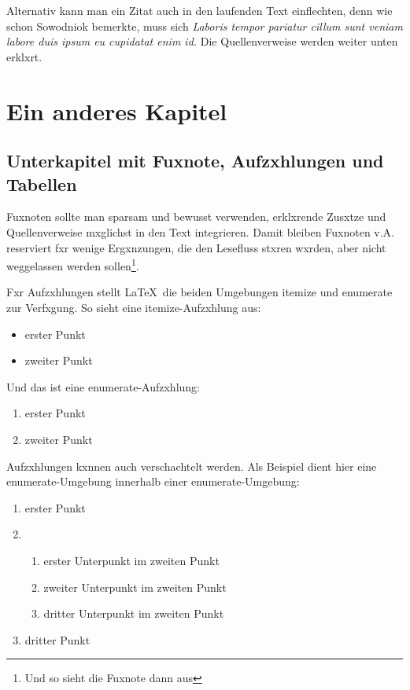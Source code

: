             Alternativ kann man ein Zitat auch in den laufenden Text einflechten, denn wie schon Sowodniok bemerkte, muss sich 
            \emph{Laboris tempor pariatur cillum sunt veniam labore duis ipsum eu cupidatat enim id.}
            Die Quellenverweise werden weiter unten erklxrt.


    \chapter{Ein anderes Kapitel}
                
        \section{Unterkapitel mit Fuxnote, Aufzxhlungen und Tabellen}\label{sec_fussnot}
                
            Fuxnoten sollte man sparsam und bewusst verwenden, erklxrende Zusxtze und Quellenverweise mxglichst in den Text integrieren. Damit bleiben Fuxnoten v.A. reserviert fxr wenige Ergxnzungen, die den Lesefluss stxren wxrden, aber nicht weggelassen werden sollen\footnote{Und so sieht die Fuxnote dann aus}.

            Fxr Aufzxhlungen stellt \LaTeX\ die beiden Umgebungen itemize und enumerate zur Verfxgung. So sieht eine itemize-Aufzxhlung aus:

            \begin{itemize}\setlength{\itemsep}{0ex} %
                \item erster Punkt
                \item zweiter Punkt
            \end{itemize}

            Und das ist eine enumerate-Aufzxhlung:

            \begin{enumerate}\setlength{\itemsep}{0ex}
                \item erster Punkt
                \item zweiter Punkt
            \end{enumerate}

            Aufzxhlungen kxnnen auch verschachtelt werden. Als Beispiel dient hier eine enumerate-Umgebung innerhalb einer enumerate-Umgebung:

            \begin{enumerate}\setlength{\itemsep}{0ex}
                \item erster Punkt
                \item 
                    \begin{enumerate}\setlength{\itemsep}{-0.5ex}
                    \item erster Unterpunkt im zweiten Punkt
                    \item zweiter Unterpunkt im zweiten Punkt
                    \item dritter Unterpunkt im zweiten Punkt
                    \end{enumerate}
                \item dritter Punkt
            \end{enumerate}

